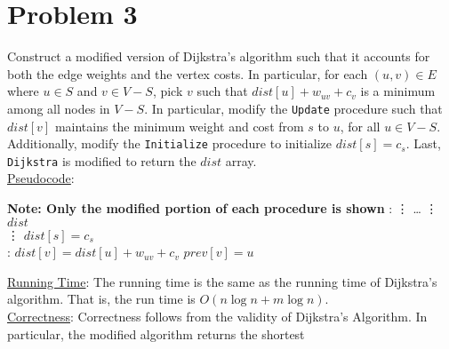 \documentclass[twoside,11pt]{homework}
\newcommand\NoProc{\renewcommand\algorithmicprocedure{}}
\begin{document}
\section*{Problem 3}
Construct a modified version of Dijkstra's algorithm such that it accounts for both the edge weights and the vertex costs.  In particular,  for each $(u, v) \in E$ where $u \in S$ and $v \in V - S$,  pick $v$ such that $dist[u] + w_{uv} + c_v$ is a minimum among all nodes in $V-S$.  In particular,  modify the \texttt{Update} procedure such that $dist[v]$ maintains the minimum weight and cost from $s$ to $u$, for all $u \in V-S$.  Additionally,  modify the \texttt{Initialize} procedure to initialize $dist[s] = c_s$.  Last,  \texttt{Dijkstra} is modified to return the $dist$ array.\\


\noindent
\underline{Pseudocode}:
\begin{algorithm}
\begin{algorithmic}[1]
\State \textbf{\color{red} Note: Only the modified portion of each procedure is shown}
\NoProc
{}:  
\State {}
\State \vdots
\State \dots {}
\State \vdots
\State \Return $dist$
\EndProcedure \\

\State \vdots
\State $dist[s] = c_s$
\EndProcedure \\

:
\State $dist[v] = dist[u] + w_{uv} + c_v$
\State $prev[v] = u$
\EndIf
\EndProcedure
\end{algorithmic}
\end{algorithm}


\noindent
\underline{Running Time}:   The running time is the same as the running time of Dijkstra's algorithm. That is, the run time is $O(n \log n + m \log n)$.  \\

\noindent
\underline{Correctness}:   Correctness follows from the validity of Dijkstra's Algorithm.  In particular, the modified algorithm returns the shortest \\
\end{document}
